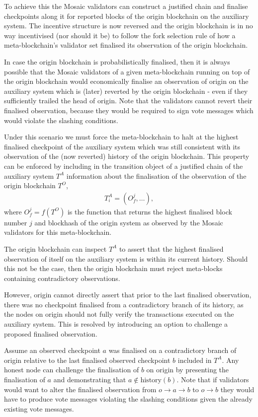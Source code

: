 \documentclass[12pt,a4paper]{article}
\begin{document}
To achieve this the Mosaic validators can construct a justified chain and finalise checkpoints along it for reported blocks of the origin blockchain on the auxiliary system. The incentive structure is now reversed and the origin blockchain is in no way incentivised (nor should it be) to follow the fork selection rule of how a meta-blockchain's validator set finalised its observation of the origin blockchain.

In case the origin blockchain is probabilistically finalised, then it is always possible that the Mosaic validators of a given meta-blockchain running on top of the origin blockchain would economically finalise an observation of origin on the auxiliary system which is (later) reverted by the origin blockchain - even if they sufficiently trailed the head of origin. Note that the validators cannot revert their finalised observation, because they would be required to sign vote messages which would violate the slashing conditions.

Under this scenario we must force the meta-blockchain to halt at the highest finalised checkpoint of the auxiliary system which was still consistent with its observation of the (now reverted) history of the origin blockchain.  This property can be enforced by including in the transition object of a justified chain of the auxiliary system $T^A$ information about the finalisation of the observation of the origin blockchain $T^O$,
\begin{align*}
  T^A_i = (O^j_f, \dots),
\end{align*}
where $O^j_f = f(T^O)$ is the function that returns the highest finalised block number $j$ and blockhash of the origin system as observed by the Mosaic validators for this meta-blockchain.

The origin blockchain can inspect $T^A$ to assert that the highest finalised observation of itself on the auxiliary system is within its current history.  Should this not be the case, then the origin blockchain must reject meta-blocks containing contradictory observations.

However, origin cannot directly assert that prior to the last finalised observation, there was no checkpoint finalised from a contradictory branch of its history, as the nodes on origin should not fully verify the transactions executed on the auxiliary system. This is resolved by introducing an option to challenge a proposed finalised observation.

Assume an observed checkpoint $a$ was finalised on a contradictory branch of origin relative to the last finalised observed checkpoint $b$ included in $T^A$. Any honest node can challenge the finalisation of $b$ on origin by presenting the finalisation of $a$ and demonstrating that $a \notin \text{history}(b)$. Note that if validators would want to alter the finalised observation from $o \rightarrow a \rightarrow b$ to $o \rightarrow b$ they would have to produce vote messages violating the slashing conditions given the already existing vote messages.
\end{document}
